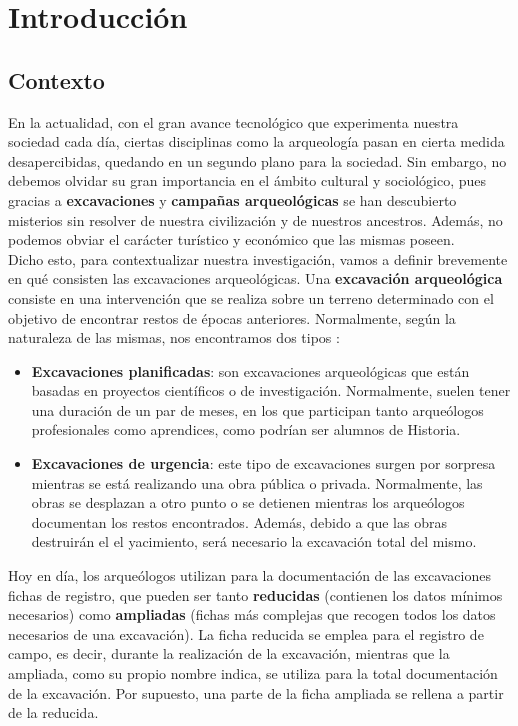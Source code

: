 \chapter{Introducción}
\section{Contexto}
En la actualidad, con el gran avance tecnológico que experimenta nuestra sociedad cada día,
ciertas disciplinas como la arqueología pasan en cierta medida desapercibidas, quedando en
un segundo plano para la sociedad. Sin embargo, no debemos olvidar su gran importancia en
el ámbito cultural y sociológico, pues gracias a \textbf{excavaciones} y \textbf{campañas
arqueológicas} se han descubierto misterios sin resolver de nuestra civilización y de
nuestros ancestros. Además, no podemos obviar el carácter turístico y económico que las
mismas poseen. \\

Dicho esto, para contextualizar nuestra investigación, vamos a definir brevemente en qué
consisten las excavaciones arqueológicas. Una \textbf{excavación arqueológica} consiste en
una intervención que se realiza sobre un terreno determinado con el objetivo de encontrar
restos de épocas anteriores. Normalmente, según la naturaleza de las mismas, nos encontramos
dos tipos \cite{excavation-type}:

    \begin{itemize}
        \item \textbf{Excavaciones planificadas}: son excavaciones arqueológicas que
        están basadas en proyectos científicos o de investigación. Normalmente, suelen
        tener una duración de un par de meses, en los que participan tanto arqueólogos
        profesionales como aprendices, como podrían ser alumnos de Historia.

        \item \textbf{Excavaciones de urgencia}: este tipo de excavaciones surgen por
        sorpresa mientras se está realizando una obra pública o privada. Normalmente,
        las obras se desplazan a otro punto o se detienen mientras los arqueólogos
        documentan los restos encontrados. Además, debido a que las obras destruirán el
        el yacimiento, será necesario la excavación total del mismo.\\
    \end{itemize}

Hoy en día, los arqueólogos utilizan para la documentación de las excavaciones fichas de
registro, que pueden ser tanto \textbf{reducidas} (contienen los datos mínimos necesarios)
como \textbf{ampliadas} (fichas más complejas que recogen todos los datos necesarios de una
excavación). La ficha reducida se emplea para el registro de campo, es decir, durante la
realización de la excavación, mientras que la ampliada, como su propio nombre indica, se
utiliza para la total documentación de la excavación. Por supuesto, una parte de la ficha
ampliada se rellena a partir de la reducida. \\ 


